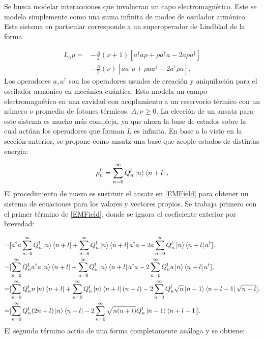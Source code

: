\documentclass[a4paper,10pt]{report}
\begin{document}
Se busca modelar interacciones que involucran un capo electromagnético. Este se modela simplemente como una suma infinita de modos de oscilador armónico. Este sistema en particular corresponde a un superoperador de Lindblad de la forma \cite{EnglertDB}

\begin{align}\label{EMField}
L_a \rho =& - \frac{A}{2}(\nu + 1)[a^\dagger a\rho + \rho a^\dagger a -2a\rho a^\dagger] \nonumber \\
 &- \frac{A}{2}(\nu)[ aa^\dagger\rho + \rho  aa^\dagger -2a^\dagger\rho a].
\end{align}Los operadores $a,a^{\dagger}$ son los operadores usuales de creación y aniquilación para el oscilador armónico en mecánica cuántica. Esto modela un campo electromagnético en una cavidad con acoplamiento a un reservorio térmico con un número $\nu$ promedio de fotones térmicos. $A,\nu \geq 0$. La elección de un ansatz para este sistema es mucho más compleja, ya que ahora la base de estados sobre la cual actúan los operadores que forman $L$ es infinita.  En base a lo visto en la sección anterior, se propone como ansatz una base que acople estados de distintas energía:

\begin{equation}
 \rho^l_n = \sum_{n=0}^\infty Q_n^l\Ket{n}\Bra{n+l},
\end{equation} El procedimiento de nuevo es sustituir el ansatz en \eqref{EMField} para obtener un sistema de ecuaciones para los valores y vectores propios. Se trabaja primero con el primer término de \eqref{EMField}, donde se ignora el coeficiente exterior por brevedad:

\begin{align*}
=&[a^\dagger a\sum_{n=0}^\infty Q_n^l\Ket{n}\Bra{n+l} + \sum_{n=0}^\infty Q_n^l\Ket{n}\Bra{n+l} a^\dagger a -2a\sum_{n=0}^\infty Q_n^l\Ket{n}\Bra{n+l} a^\dagger],\\
=&[\sum_{n=0}^\infty Q_n^la^\dagger a\Ket{n}\Bra{n+l} + \sum_{n=0}^\infty Q_n^l\Ket{n}\Bra{n+l} a^\dagger a -2\sum_{n=0}^\infty Q_n^la\Ket{n}\Bra{n+l} a^\dagger],\\
=&[\sum_{n=0}^\infty Q_n^ln\Ket{n}\Bra{n+l} + \sum_{n=0}^\infty Q_n^l\Ket{n}\Bra{n+l} (n+l) -2\sum_{n=0}^\infty Q_n^l\sqrt{n}\Ket{n-1}\Bra{n+l-1}\sqrt{n+l}],\\
=&[\sum_{n=0}^\infty Q_n^l(2n+l)\Ket{n}\Bra{n+l} -2\sum_{n=0}^\infty\sqrt{n(n+l)} Q_n^l\Ket{n-1}\Bra{n+l-1}].\\
\end{align*} El segundo término actúa de una forma completamente análoga y se obtiene:
\end{document}
